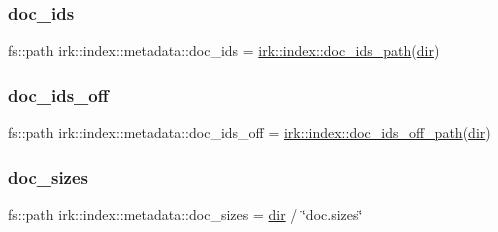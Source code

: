 \mbox{\label{structirk_1_1index_1_1metadata_a20168da918488d66694b1da2f0542b83}} 
\subsubsection{\texorpdfstring{doc\+\_\+ids}{doc\_ids}}
{\footnotesize\ttfamily fs\+::path irk\+::index\+::metadata\+::doc\+\_\+ids = \mbox{\hyperlink{namespaceirk_1_1index_a1680416c227181a5ab2f0b0169adb11e}{irk\+::index\+::doc\+\_\+ids\+\_\+path}}(\mbox{\hyperlink{structirk_1_1index_1_1metadata_a355b4325c022cd152e68fc18b1775fc6}{dir}})}

\mbox{\label{structirk_1_1index_1_1metadata_a249ece1de7a87e894345d7c987609e8e}} 
\subsubsection{\texorpdfstring{doc\+\_\+ids\+\_\+off}{doc\_ids\_off}}
{\footnotesize\ttfamily fs\+::path irk\+::index\+::metadata\+::doc\+\_\+ids\+\_\+off = \mbox{\hyperlink{namespaceirk_1_1index_aae22e4280b8fc44a46c81159429bf889}{irk\+::index\+::doc\+\_\+ids\+\_\+off\+\_\+path}}(\mbox{\hyperlink{structirk_1_1index_1_1metadata_a355b4325c022cd152e68fc18b1775fc6}{dir}})}

\mbox{\label{structirk_1_1index_1_1metadata_a7aa4d97e4e11c582380ad03e18eb62bb}} 
\subsubsection{\texorpdfstring{doc\+\_\+sizes}{doc\_sizes}}
{\footnotesize\ttfamily fs\+::path irk\+::index\+::metadata\+::doc\+\_\+sizes = \mbox{\hyperlink{structirk_1_1index_1_1metadata_a355b4325c022cd152e68fc18b1775fc6}{dir}} / \char`\"{}doc.\+sizes\char`\"{}}

